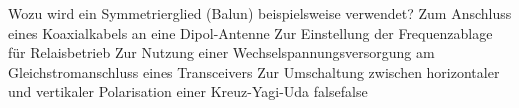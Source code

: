     {Wozu wird ein Symmetrierglied (Balun) beispielsweise verwendet?}
    {Zum Anschluss eines Koaxialkabels an eine Dipol-Antenne}
    {Zur Einstellung der Frequenzablage für Relaisbetrieb}
    {Zur Nutzung einer Wechselspannungsversorgung am Gleichstromanschluss eines Transceivers}
    {Zur Umschaltung zwischen horizontaler und vertikaler Polarisation einer Kreuz-Yagi-Uda}
    {false}{false}